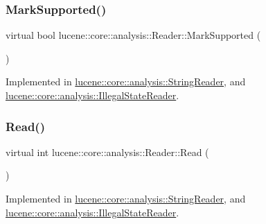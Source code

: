 \mbox{\label{classlucene_1_1core_1_1analysis_1_1Reader_a230fae02ca4a63de33fdaad6f9aafd96}} 
\subsubsection{\texorpdfstring{Mark\+Supported()}{MarkSupported()}}
{\footnotesize\ttfamily virtual bool lucene\+::core\+::analysis\+::\+Reader\+::\+Mark\+Supported (\begin{DoxyParamCaption}{ }\end{DoxyParamCaption})\hspace{0.3cm}{\ttfamily [pure virtual]}}



Implemented in \mbox{\hyperlink{classlucene_1_1core_1_1analysis_1_1StringReader_a1b9e55036f01d10650fd4026f23da629}{lucene\+::core\+::analysis\+::\+String\+Reader}}, and \mbox{\hyperlink{classlucene_1_1core_1_1analysis_1_1IllegalStateReader_ae2de5e9375664ca55c80b224ac3cd998}{lucene\+::core\+::analysis\+::\+Illegal\+State\+Reader}}.

\mbox{\label{classlucene_1_1core_1_1analysis_1_1Reader_ae8e04911b6a4c06bb026ca6e74071cb2}} 
\subsubsection{\texorpdfstring{Read()}{Read()}\hspace{0.1cm}{\footnotesize\ttfamily [1/2]}}
{\footnotesize\ttfamily virtual int lucene\+::core\+::analysis\+::\+Reader\+::\+Read (\begin{DoxyParamCaption}{ }\end{DoxyParamCaption})\hspace{0.3cm}{\ttfamily [pure virtual]}}



Implemented in \mbox{\hyperlink{classlucene_1_1core_1_1analysis_1_1StringReader_ac9c1bb033ee4f5862e47e90c422d3381}{lucene\+::core\+::analysis\+::\+String\+Reader}}, and \mbox{\hyperlink{classlucene_1_1core_1_1analysis_1_1IllegalStateReader_a9bca98f676ac3d0eeadfd4a2cc78d764}{lucene\+::core\+::analysis\+::\+Illegal\+State\+Reader}}.

